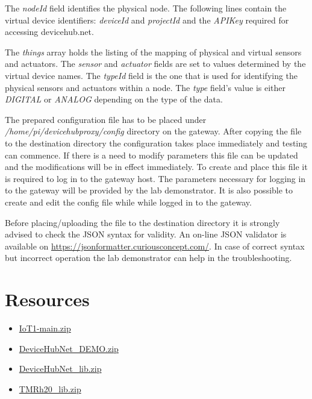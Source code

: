 \documentclass[a4paper]{article}
\begin{document}
The \emph{nodeId} field identifies the physical node. The following lines contain the virtual
device identifiers: \emph{deviceId} and \emph{projectId} and the \emph{APIKey} required for
accessing devicehub.net.

The \emph{things} array holds the listing of the mapping of physical and virtual sensors and
actuators. The \emph{sensor} and \emph{actuator} fields are set to values determined by the
virtual device names. The \emph{typeId} field is the one that is used for identifying the
physical sensors and actuators within a node. The \emph{type} field's value is either \emph{DIGITAL}
or \emph{ANALOG} depending on the type of the data.

The prepared configuration file has to be placed under \emph{/home/pi/devicehubproxy/config}
directory on the gateway. After copying the file to the destination directory the configuration
takes place immediately and testing can commence. If there is a need to modify parameters this
file can be updated and the modifications will be in effect immediately.
To create and place this file it is required to log in to the gateway host. The parameters necessary
for logging in to the gateway will be provided by the lab demonstrator. It is also possible
to create and edit the config file while while logged in to the gateway.

Before placing/uploading the file to the destination directory it is strongly advised to check
the JSON syntax for validity. An on-line JSON validator is available on
\url{https://jsonformatter.curiousconcept.com/}.
In case of correct syntax but incorrect operation the lab demonstrator can help in the troubleshooting.

\appendix

\section{Resources}
\begin{itemize}
    \item \href{https://www.tmit.bme.hu/sites/default/files/attachments/IoT1-main.zip}{IoT1-main.zip}
    \item \href{https://www.tmit.bme.hu/sites/default/files/attachments/DeviceHubNet_DEMO.zip}{DeviceHubNet\_DEMO.zip}
    \item \href{https://www.tmit.bme.hu/sites/default/files/attachments/DeviceHubNet_lib.zip}{DeviceHubNet\_lib.zip}
    \item \href{https://www.tmit.bme.hu/sites/default/files/attachments/TMRh20_lib.zip}{TMRh20\_lib.zip}
\end{itemize}
\end{document}

